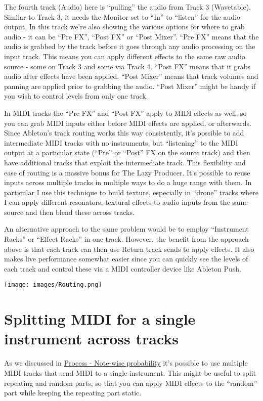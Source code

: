 \documentclass[
  12pt,
  letterpaper,
  oneside,
  open=any]{scrbook}
\begin{document}
The fourth track (Audio) here is ``pulling'' the audio from Track 3
(Wavetable). Similar to Track 3, it needs the Monitor set to ``In'' to
``listen'' for the audio output. In this track we're also showing the
various options for where to grab audio - it can be ``Pre FX'', ``Post
FX'' or ``Post Mixer''. ``Pre FX'' means that the audio is grabbed by
the track before it goes through any audio processing on the input
track. This means you can apply different effects to the same raw audio
source - some on Track 3 and some via Track 4. ``Post FX'' means that it
grabs audio after effects have been applied. ``Post Mixer'' means that
track volumes and panning are applied prior to grabbing the audio.
``Post Mixer'' might be handy if you wish to control levels from only
one track.

In MIDI tracks the ``Pre FX'' and ``Post FX'' apply to MIDI effects as
well, so you can grab MIDI inputs either before MIDI effects are
applied, or afterwards. Since Ableton's track routing works this way
consistently, it's possible to add intermediate MIDI tracks with no
instruments, but ``listening'' to the MIDI output at a particular state
(``Pre'' or ``Post'' FX on the source track) and then have additional
tracks that exploit the intermediate track. This flexibility and ease of
routing is a massive bonus for The Lazy Producer. It's possible to reuse
inputs across multiple tracks in multiple ways to do a huge range with
them. In particular I use this technique to build texture, especially in
``drone'' tracks where I can apply different resonators, textural
effects to audio inputs from the same source and then blend these across
tracks.

An alternative approach to the same problem would be to employ
``Instrument Racks'' or ``Effect Racks'' in one track. However, the
benefit from the approach above is that each track can then use Return
track sends to apply effects. It also makes live performance somewhat
easier since you can quickly see the levels of each track and control
these via a MIDI controller device like Ableton Push.

\texttt{[image: images/Routing.png]}

\section{Splitting MIDI for a single instrument across
tracks}\label{splitting-midi-for-a-single-instrument-across-tracks}

As we discussed in
\hyperref[Chapter-002-Process-Note_wise_probability]{Process - Note-wise
probability} it's possible to use multiple MIDI tracks that send MIDI to
a single instrument. This might be useful to split repeating and random
parts, so that you can apply MIDI effects to the ``random'' part while
keeping the repeating part static.
\end{document}
